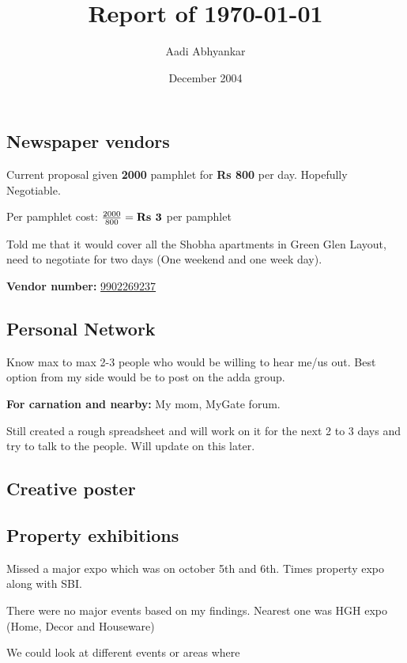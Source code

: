 \documentclass[12pt, a4paper]{article}
\begin{document}
\title{Report of \today}
\author{Aadi Abhyankar}
\date{December 2004}
\maketitle

\subsection{Newspaper vendors}

Current proposal given \textbf{2000} pamphlet for \textbf{Rs 800} per day. Hopefully Negotiable.

\vspace{0.5cm}

Per pamphlet cost: $\frac{2000}{800} = \textbf{Rs \the\numexpr 2000 / 800 \relax} $ per pamphlet

\bigskip

\noindent Told me that it would cover all the Shobha apartments in Green Glen Layout, need to negotiate for two days (One weekend and one week day).

\bigskip

\textbf{Vendor number:} \href{tel:+919902269237}{9902269237}

\subsection{Personal Network}

Know max to max 2-3 people who would be willing to hear me/us out. Best option from my side would be to post on the adda group.

\vspace{0.25cm}

\noindent \textbf{For carnation and nearby:} My mom, MyGate forum.

\vspace{0.25cm}

\noindent Still created a rough spreadsheet and will work on it for the next 2 to 3 days and try to talk to the people. Will update on this later.

\subsection{Creative poster}

\subsection{Property exhibitions}

Missed a major expo which was on october 5th and 6th. Times property expo along with SBI.

\noindent There were no major events based on my findings.
Nearest one was HGH expo (Home, Decor and Houseware)

\vspace{0.5cm}

We could look at different events or areas where
\end{document}
